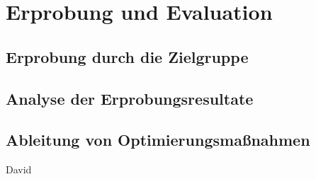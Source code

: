 \chapter{Erprobung und Evaluation}
\section{Erprobung durch die Zielgruppe}
\section{Analyse der Erprobungsresultate}
\section{Ableitung von Optimierungsmaßnahmen}
David


